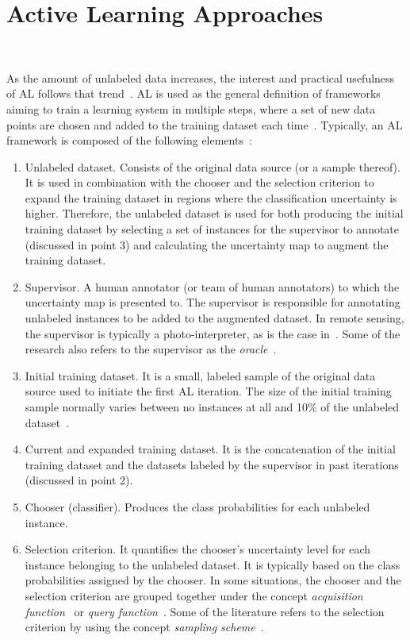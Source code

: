 \section{Active Learning Approaches}~\label{sec:al-sota-al-generator}

As the amount of unlabeled data increases, the interest and practical
usefulness of AL follows that trend~\cite{Kottke2017}. AL is used as the
general definition of frameworks aiming to train a learning system in multiple
steps, where a set of new data points are chosen and added to the training
dataset each time~\cite{Ruzicka2020}. Typically, an AL framework is composed
of the following elements~\cite{Sverchkov2017,Su2020,Ruzicka2020}:

\begin{enumerate}
    \item Unlabeled dataset. Consists of the original data source (or a sample
        thereof). It is used in combination with the chooser and the selection
        criterion to expand the training dataset in regions where the
        classification uncertainty is higher. Therefore, the unlabeled
        dataset is used for both producing the initial training
        dataset by selecting a set of instances for the
        supervisor to annotate (discussed in point 3) and calculating the
        uncertainty map to augment the training dataset.
    \item Supervisor. A human annotator (or team of human
        annotators) to which the uncertainty map is
        presented to. The supervisor is responsible for annotating unlabeled
        instances to be added to the augmented dataset. In remote sensing, the
        supervisor is typically a photo-interpreter, as is the case
        in~\cite{li2020}. Some of the research also refers to the supervisor
        as the \textit{oracle}~\cite{Ruzicka2020, Yoo2019, Aghdam2019,
        Cawley2011}.
    \item Initial training dataset. It is a small, labeled sample of
        the original data source used to initiate the first AL
        iteration. The size of the initial training sample normally varies
        between no instances at all and 10\% of the unlabeled
        dataset~\cite{Li2013}.
    \item Current and expanded training dataset. It is the concatenation of
        the initial training dataset and the datasets labeled by the
        supervisor in past iterations (discussed in point 2).
    \item Chooser (classifier). Produces the class probabilities for each
        unlabeled instance.
    \item Selection criterion. It quantifies the chooser's uncertainty level
        for each instance belonging to the unlabeled dataset. It is typically
        based on the class probabilities assigned by the chooser. In some
        situations, the chooser and the selection criterion are grouped
        together under the concept \textit{acquisition
        function}~\cite{Ruzicka2020} or \textit{query function}~\cite{Su2020}.
        Some of the literature refers to the selection criterion by using the
        concept \textit{sampling scheme}~\cite{Liu2020}.
\end{enumerate}

